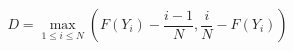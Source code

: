 

\[
D = \max_{1 \le i \le N} \left( F(Y_{i}) - \frac{i-1} {N}, \frac{i}{N} - F(Y_{i}) \right)
\]


